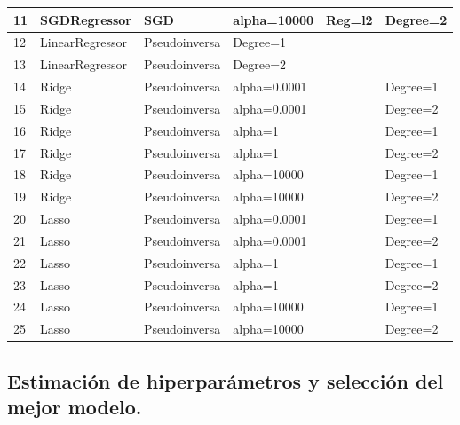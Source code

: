 \documentclass[a4paper,11pt]{article}
\begin{document}
\begin{table}[h]
\begin{tabular}{|l|l|l|l|l|l|}
\hline
11     & SGDRegressor    & SGD           & alpha=10000         & Reg=l2      & Degree=2  \\ \hline
12     & LinearRegressor & Pseudoinversa & \multicolumn{3}{l|}{Degree=1}                 \\ \hline
13     & LinearRegressor & Pseudoinversa & \multicolumn{3}{l|}{Degree=2}                 \\ \hline
14     & Ridge           & Pseudoinversa & \multicolumn{2}{l|}{alpha=0.0001} & Degree=1  \\ \hline
15     & Ridge           & Pseudoinversa & \multicolumn{2}{l|}{alpha=0.0001} & Degree=2  \\ \hline
16     & Ridge           & Pseudoinversa & \multicolumn{2}{l|}{alpha=1}      & Degree=1  \\ \hline
17     & Ridge           & Pseudoinversa & \multicolumn{2}{l|}{alpha=1}      & Degree=2  \\ \hline
18     & Ridge           & Pseudoinversa & \multicolumn{2}{l|}{alpha=10000}  & Degree=1  \\ \hline
19     & Ridge           & Pseudoinversa & \multicolumn{2}{l|}{alpha=10000}  & Degree=2  \\ \hline
20     & Lasso           & Pseudoinversa & \multicolumn{2}{l|}{alpha=0.0001} & Degree=1  \\ \hline
21     & Lasso           & Pseudoinversa & \multicolumn{2}{l|}{alpha=0.0001} & Degree=2  \\ \hline
22     & Lasso           & Pseudoinversa & \multicolumn{2}{l|}{alpha=1}      & Degree=1  \\ \hline
23     & Lasso           & Pseudoinversa & \multicolumn{2}{l|}{alpha=1}      & Degree=2  \\ \hline
24     & Lasso           & Pseudoinversa & \multicolumn{2}{l|}{alpha=10000}  & Degree=1  \\ \hline
25     & Lasso           & Pseudoinversa & \multicolumn{2}{l|}{alpha=10000}  & Degree=2  \\ \hline

\end{tabular}
\end{table}

\subsection{Estimación de hiperparámetros y selección del mejor modelo.}
\end{document}
